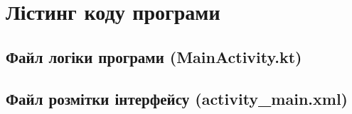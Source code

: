 ﻿%
\chapter{Лістинг коду програми}
\label{apdx:code}

\section*{Файл логіки програми (MainActivity.kt)}


\newpage

\section*{Файл розмітки інтерфейсу (activity\_main.xml)}

